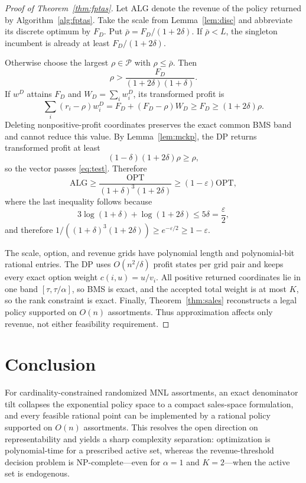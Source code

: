 \documentclass[11pt]{article}
\newcommand{\OPT}{\mathrm{OPT}}
\newcommand{\ALG}{\mathrm{ALG}}
\begin{document}
\begin{proof}[Proof of Theorem~\ref{thm:fptas}]
Let $\ALG$ denote the revenue of the policy returned by Algorithm~\ref{alg:fptas}. Take the scale from Lemma~\ref{lem:disc} and abbreviate its discrete optimum by $F_D$. Put $\bar\rho=F_D/(1+2\delta)$. If $\bar\rho<L$, the singleton incumbent is already at least $F_D/(1+2\delta)$.

Otherwise choose the largest $\rho\in\mathcal P$ with $\rho\le\bar\rho$. Then
\[
 \rho>\frac{F_D}{(1+2\delta)(1+\delta)}.
\]
If $w^D$ attains $F_D$ and $W_D=\sum_iw_i^D$, its transformed profit is
\[
 \sum_i(r_i-\rho)w_i^D=F_D+(F_D-\rho)W_D\ge F_D\ge(1+2\delta)\rho.
\]
Deleting nonpositive-profit coordinates preserves the exact common BMS band and cannot reduce this value. By Lemma~\ref{lem:mckp}, the DP returns transformed profit at least
\[
 (1-\delta)(1+2\delta)\rho\ge\rho,
\]
so the vector passes \eqref{eq:test}. Therefore
\[
 \ALG\ge\frac{\OPT}{(1+\delta)^3(1+2\delta)}\ge(1-\varepsilon)\OPT,
\]
where the last inequality follows because
\[
 3\log(1+\delta)+\log(1+2\delta)
 \le5\delta=\frac\varepsilon2,
\]
and therefore $1/((1+\delta)^3(1+2\delta))\ge e^{-\varepsilon/2}\ge1-\varepsilon$.

The scale, option, and revenue grids have polynomial length and polynomial-bit rational entries. The DP uses $O(n^2/\delta)$ profit states per grid pair and keeps every exact option weight $c(i,u)=u/v_i$. All positive returned coordinates lie in one band $[\tau,\tau/\alpha]$, so BMS is exact, and the accepted total weight is at most $K$, so the rank constraint is exact. Finally, Theorem~\ref{thm:sales} reconstructs a legal policy supported on $O(n)$ assortments. Thus approximation affects only revenue, not either feasibility requirement.
\end{proof}

\section{Conclusion}\label{sec:conclusion}
For cardinality-constrained randomized MNL assortments, an exact denominator tilt collapses the exponential policy space to a compact sales-space formulation, and every feasible rational point can be implemented by a rational policy supported on $O(n)$ assortments. This resolves the open direction on representability and yields a sharp complexity separation: optimization is polynomial-time for a prescribed active set, whereas the revenue-threshold decision problem is NP-complete---even for $\alpha=1$ and $K=2$---when the active set is endogenous.
\end{document}
